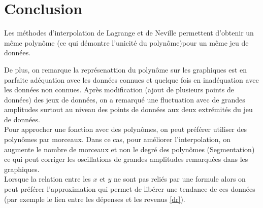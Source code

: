 \documentclass[12pt,french,titlepage]{article}
\begin{document}
	\section{Conclusion}

	Les méthodes d'interpolation de Lagrange et de Neville permettent d'obtenir un même polynôme (ce qui démontre l'unicité du polynôme)pour un même jeu de données. 
	
	De plus, on remarque la représenattion du polynôme sur les graphiques est en parfaite adéquation avec les données connues et quelque fois en inadéquation avec les données non connues. Après modification (ajout de plusieurs points de données) des jeux de données, on a remarqué une fluctuation avec de grandes amplitudes surtout au niveau des points de données aux deux extrémités du jeu de données.\\
	
	Pour approcher une fonction avec des polynômes, on peut préférer utiliser des polynômes par morceaux. Dans ce cas, pour améliorer l'interpolation, on augmente le nombre de morceaux et non le degré des polynômes (Segmentation) ce qui peut corriger les oscillations de grandes amplitudes remarquées dans les graphiques.\\
	
	Lorsque la relation entre les $x$ et $y$ ne sont pas reliés par une formule alors on peut préférer l'approximation qui permet de libérer une tendance de ces données (par exemple le lien entre les dépenses et les revenus \ref{dr}).
	
\end{document}
